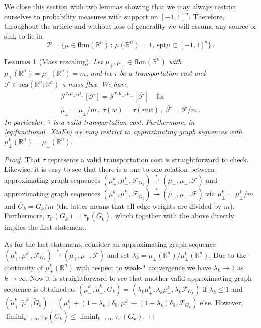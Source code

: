 \documentclass[10pt,a4paper,oneside,final]{article}
\newcommand{\R}{{\mathbb{R}}}
\newcommand{\rca}{\mathrm{rca}}
\newcommand{\fbm}{{\mathrm{fbm}}}
\newcommand{\prob}{{\mathcal{P}}}
\newcommand{\spt}{{\mathrm{spt}}}
\newcommand{\weakstarto}{\stackrel{*}{\rightharpoonup}}
\newcommand{\flux}{{\mathcal{F}}}
\newcommand{\JEn}{{\mathcal{J}}}
\newcommand{\JEnXia}[1][\tau]{#1_{\mathrm{F}}}%
\newcommand{\transportPath}{mass flux}
\numberwithin{equation}{section}
\theoremstyle{plain}
\newtheorem{lemma}[theorem]{Lemma}
\theoremstyle{definition}
\theoremstyle{remark}
\begin{document}
We close this section with two lemmas showing that we may always restrict ourselves to probability measures with support on $[-1,1]^n$.
Therefore, throughout the article and without loss of generality we will assume any source or sink to lie in
\begin{equation*}
\prob=\{\mu\in\fbm(\R^n)\,:\,\mu(\R^n)=1,\,\spt\mu\subset[-1,1]^n\}\,.
\end{equation*}

\begin{lemma}[Mass rescaling]\label{lem:initial_and_final_measures_can_be_rescaled}
Let $\mu_+,\mu_-\in\fbm(\R^n)$ with $\mu_+(\R^n)=\mu_-(\R^n)=m$, and let $\tau$ be a transportation cost and $\flux\in\rca(\R^n;\R^n)$ a \transportPath{}.
We have
\begin{gather*}
\JEn^{\tau,\mu_+,\mu_-}[\flux]=\JEn^{\overline\tau,\overline\mu_+,\overline\mu_-}[\overline\flux]\quad\text{for}\\
\overline\mu_\pm=\mu_\pm/m\,,\;
\overline\tau(w)=\tau(mw)\,,\;
\overline\flux=\flux/m\,.
\end{gather*}
In particular, $\overline\tau$ is a valid transportation cost.
Furthermore, in \eqref{eq:functional_XiaEn} we may restrict to approximating graph sequences with $\mu_\pm^k(\R^n)=\mu_\pm(\R^n)$.
\end{lemma}

\begin{proof}
That $\overline\tau$ represents a valid transportation cost is straightforward to check.
Likewise, it is easy to see that there is a one-to-one relation between approximating graph sequences $(\mu_+^k,\mu_-^k,\flux_{G_k})\weakstarto(\mu_+,\mu_-,\flux)$
and approximating graph sequences $(\overline\mu_+^k,\overline\mu_-^k,\flux_{\overline G_k})\weakstarto(\overline\mu_+,\overline\mu_-,\overline\flux)$
via $\overline\mu_\pm^k=\mu_\pm^k/m$ and $\overline G_k=G_k/m$ (the latter means that all edge weights are divided by $m$).
Furthermore, $\JEnXia(G_k)=\JEnXia[\overline\tau](\overline G_k)$, which together with the above directly implies the first statement.

As for the last statement, consider an approximating graph sequence $(\mu_+^k,\mu_-^k,\flux_{G_k})\weakstarto(\mu_+,\mu_-,\flux)$ and set $\lambda_k=\mu_\pm(\R^n)/\mu_\pm^k(\R^n)$.
Due to the continuity of $\mu_\pm^k(\R^n)$ with respect to weak-$*$ convergence we have $\lambda_k\to1$ as $k\to\infty$.
Now it is straightforward to see that another valid approximating graph sequence is obtained as
$(\tilde\mu_+^k,\tilde\mu_-^k,\tilde G_k)=(\lambda_k\mu_+^k,\lambda_k\mu_-^k,\lambda_k\flux_{G_k})$ if $\lambda_k\leq1$ and $(\tilde\mu_+^k,\tilde\mu_-^k,\tilde G_k)=(\mu_+^k+(1-\lambda_k)\delta_0,\mu_-^k+(1-\lambda_k)\delta_0,\flux_{G_k})$ else.
However, $\liminf_{k \to \infty} \JEnXia(\tilde G_k)\leq\liminf_{k \to \infty} \JEnXia(G_k)$.%
\end{proof}
\end{document}
